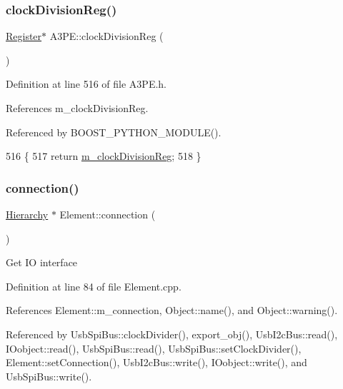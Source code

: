\subsubsection{\texorpdfstring{clock\+Division\+Reg()}{clockDivisionReg()}}
{\footnotesize\ttfamily \hyperlink{classRegister}{Register}$\ast$ A3\+P\+E\+::clock\+Division\+Reg (\begin{DoxyParamCaption}{ }\end{DoxyParamCaption})\hspace{0.3cm}{\ttfamily [inline]}}



Definition at line 516 of file A3\+P\+E.\+h.



References m\+\_\+clock\+Division\+Reg.



Referenced by B\+O\+O\+S\+T\+\_\+\+P\+Y\+T\+H\+O\+N\+\_\+\+M\+O\+D\+U\+L\+E().


\begin{DoxyCode}
516                               \{
517     \textcolor{keywordflow}{return} \hyperlink{classA3PE_ae1f4c24a99c2e6ae944a080f429cc155}{m\_clockDivisionReg};
518   \}
\end{DoxyCode}
\mbox{\label{classElement_af57444353c1ddf9fa0109801e97debf7}} 
\subsubsection{\texorpdfstring{connection()}{connection()}}
{\footnotesize\ttfamily \hyperlink{classHierarchy}{Hierarchy} $\ast$ Element\+::connection (\begin{DoxyParamCaption}{ }\end{DoxyParamCaption})\hspace{0.3cm}{\ttfamily [inherited]}}

Get IO interface 

Definition at line 84 of file Element.\+cpp.



References Element\+::m\+\_\+connection, Object\+::name(), and Object\+::warning().



Referenced by Usb\+Spi\+Bus\+::clock\+Divider(), export\+\_\+obj(), Usb\+I2c\+Bus\+::read(), I\+Oobject\+::read(), Usb\+Spi\+Bus\+::read(), Usb\+Spi\+Bus\+::set\+Clock\+Divider(), Element\+::set\+Connection(), Usb\+I2c\+Bus\+::write(), I\+Oobject\+::write(), and Usb\+Spi\+Bus\+::write().


